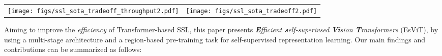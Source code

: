 \documentclass{article} \usepackage{iclr2022_conference,times}
\newcommand{\shortname}{EsViT}
\begin{document}
\begin{figure*}[t!]\vspace{-0mm}\centering
	\begin{tabular}{c c}
		\hspace{-4mm}
		\texttt{[image: figs/ssl\_sota\_tradeoff\_throughput2.pdf]}  & 
\hspace{-0mm}
		\texttt{[image: figs/ssl\_sota\_tradeoff2.pdf]} \\
\end{tabular}
	\vspace{-3mm}
	\caption{Efficiency vs accuracy comparison under the linear classification protocol on ImageNet. Left: Throughput of all SoTA SSL vision systems, circle sizes indicates model parameter counts; Right: performance over varied parameter counts for models with moderate (throughout/\#parameters) ratio. \shortname{} pre-trained with and without the region-matching task are shown before and after the arrows, respectively. Please refer Section~\ref{sec:imagenet_probe} for details.
	 }
	\vspace{-5mm}
	\label{fig:hero_cmp}
\end{figure*}





Aiming to improve the {\em efficiency} of Transformer-based SSL, this paper presents {\em {\bf E}fficient {\bf s}elf-superivsed {\bf Vi}sion {\bf T}ransformers} (\shortname{}), by using a multi-stage architecture and a region-based pre-training task for self-supervised representation learning. 
Our main findings and contributions can be summarized as follows:
\end{document}
